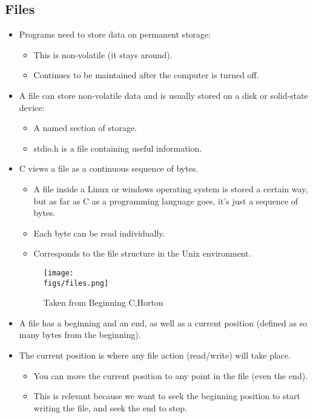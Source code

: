 \subsection{Files}
\begin{itemize}
    \item Programs need to store data on permanent storage:
        \begin{itemize}
            \item This is non-volatile (it stays around).
            \item Continues to be maintained after the computer is turned off.
        \end{itemize}
    
    \item A file can store non-volatile data and is usually stored on a disk or solid-state device:
        \begin{itemize}
            \item A named section of storage.
            \item stdio.h is a file containing useful information.
        \end{itemize}
    
    \item C views a file as a continuous sequence of bytes.
        \begin{itemize}
            \item A file inside a Linux or windows operating system is stored a certain way, but as far as C as a programming language goes, it's just a sequence of bytes.
            \item Each byte can be read individually.
            \item Corresponds to the file structure in the Unix environment.
        \end{itemize}
    
        \begin{figure}[H]
            \centering
            \texttt{[image: \\figs/files.png]} 
            \caption{Taken from Beginning C,Horton}
        \end{figure}
        
    \item A file has a beginning and an end, as well as a current position (defined as so many bytes from the beginning).
    \item The current position is where any file action (read/write) will take place.
        \begin{itemize}
            \item You can move the current position to any point in the file (even the end).
            \item This is relevant because we want to seek the beginning position to start writing the file, and seek the end to stop.
        \end{itemize}
\end{itemize}


